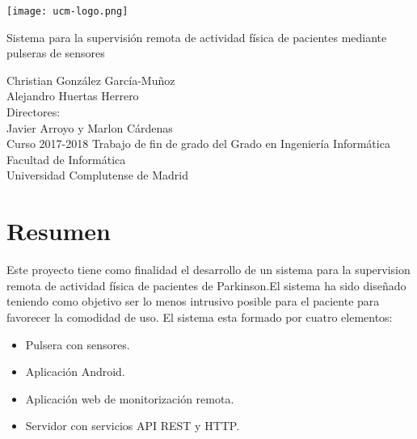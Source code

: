 \documentclass[11pt,spanish]{article}
\author{
\Large Christian González García-Muñoz \\ 
\Large Alejandro Huertas Herrero 
}
\date{}
\begin{document}
\begin{titlepage}
	\centering
    \texttt{[image: ucm-logo.png]}
    \vskip 1cm
    
    \centering
    {\huge Sistema para la supervisión remota de actividad física de pacientes mediante pulseras de sensores 
    }
    \newline
    \newline
    \newline
    \newline
    
	\centering \large { Christian González García-Muñoz \\  Alejandro Huertas Herrero \\ 
    					\bigskip Directores: \\ Javier Arroyo y Marlon Cárdenas \\ \bigskip}
    \vskip 1cm
    \centering \Large {Curso 2017-2018}
    \vskip 1cm
    \centering \Large { Trabajo de fin de grado del Grado en Ingeniería Informática }
	\vskip 1cm
    \centering \large {Facultad de Informática \\ Universidad Complutense de Madrid}
    \vskip 0.5cm

\end{titlepage}
\clearpage
\vphantom{a}
\newpage


\section*{Resumen}

Este proyecto tiene como finalidad el desarrollo de un sistema para la supervision remota de actividad física de pacientes de Parkinson.El sistema ha sido diseñado teniendo como objetivo ser lo menos intrusivo posible para el paciente para favorecer la comodidad de uso. El sistema esta formado por cuatro elementos:

\begin{itemize}
    \item Pulsera con sensores. 
	\item Aplicación Android. 
	\item Aplicación web de monitorización remota.
    \item Servidor con servicios API REST y HTTP.
    \newline
\end{itemize}
\end{document}
